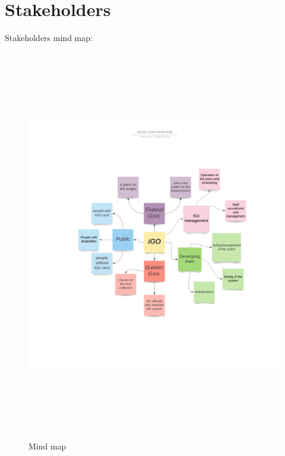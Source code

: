\documentclass[12pt]{report}
\begin{document}
\vspace{\baselineskip}


\section{Stakeholders}

{\fontsize{14pt}{16.8pt}\selectfont Stakeholders mind map:\par}\par




\begin{figure}[H]
	\begin{Center}
		\includegraphics[width=450.75pt,height=486.75pt]{./p2_image2.jpeg}
	\end{Center}
  \caption{Mind map}
\end{figure}


\end{document}
